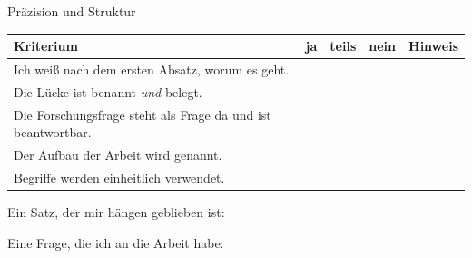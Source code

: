 \begin{uebungsblatt}{Präzision und Struktur}
\begin{center}\small
\renewcommand{\arraystretch}{1.8}
\begin{tabular}{|p{}|c|c|c|p{}|}
\hline
\textbf{Kriterium} & \textbf{ja} & \textbf{teils} & \textbf{nein} & \textbf{Hinweis} \\
\hline
Ich weiß nach dem ersten Absatz, worum es geht. & & & & \\ \hline
Die Lücke ist benannt \emph{und} belegt. & & & & \\ \hline
Die Forschungsfrage steht als Frage da und ist beantwortbar. & & & & \\ \hline
Der Aufbau der Arbeit wird genannt. & & & & \\ \hline
Begriffe werden einheitlich verwendet. & & & & \\ \hline
\end{tabular}
\end{center}
Ein Satz, der mir hängen geblieben ist: \hrulefill\par\medskip
Eine Frage, die ich an die Arbeit habe: \hrulefill

\end{uebungsblatt}

